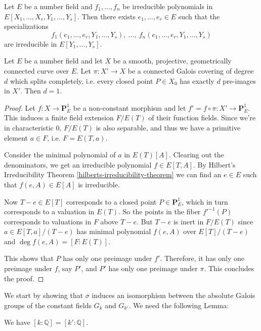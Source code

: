 \begin{theorem}\label{hilberts-irreducibility-theorem}
Let $E$ be a number field and $f_1,\ldots, f_n$ be irreducible polynomials in $E[X_1,\ldots,X_r,Y_1,\ldots,Y_s]$. Then there exists $e_1,\ldots,e_r\in E$ such that the specializations
\[ f_1(e_1,\ldots,e_r,Y_1,\ldots,Y_s),\ \ldots,\ f_n(e_1,\ldots,e_r,Y_1,\ldots,Y_s) \]
are irreducible in $E[Y_1,\ldots,Y_s]$.
\end{theorem}

\begin{lemma}\label{4.1}
Let $E$ be a number field and let $X$ be a smooth, projective, geometrically connected curve over $E$. Let $\pi:X'\to X$ be a connected Galois covering of degree $d$ which splits completely, i.e. every closed point $P\in X_0$ has exactly $d$ pre-images in $X'$. Then $d=1$.
\end{lemma}

\begin{proof}
Let $f: X\to\mathbf{P}^1_E$ be a non-constant morphism and let $f' =  f\circ \pi: X'\to\mathbf{P}^1_E$. This induces a finite field extension $F/E(T)$ of their function fields. Since we're in characteristic $0$, $F/E(T)$ is also separable, and thus we have a primitive element $a\in F$, i.e. $F = E(T,a)$. 

Consider the minimal polynomial of $a$ in $E(T)[A]$. Clearing out the denominators, we get an irreducible polynomial $f\in E[T,A]$. By Hilbert's Irreducibility Theorem \ref{hilberts-irreducibility-theorem} we can find an $e\in E$ such that $f(e,A)\in E[A]$ is irreducible. 

Now $T-e\in E[T]$ corresponds to a closed point $P\in \mathbf{P}^1_E$, which in turn corresponds to a valuation in $E(T)$. So the points in the fiber $f'^{-1}(P)$ corresponds to valuations in $F$ above $T-e$. But $T-e$ is inert in $F/E(T)$ since $a\in E[T,a]/(T-e)$ has minimal polynomial $f(e,A)$ over $E[T]/(T-e)$ and $\deg f(e,A) = [F:E(T)]$. 

This shows that $P$ has only one preimage under $f'$. Therefore, it has only one preimage under $f$, say $P'$, and $P'$ has only one preimage under $\pi$. This concludes the proof.
\end{proof}

We start by showing that $\sigma$ induces an isomorphism between the absolute Galois groups of the constant fields $G_k$ and $G_{k'}$. We need the following Lemma:

\begin{lemma}\label{4.2-pre}
We have $[k:\mathbb{Q}] = [k':\mathbb{Q}]$.
\end{lemma}

